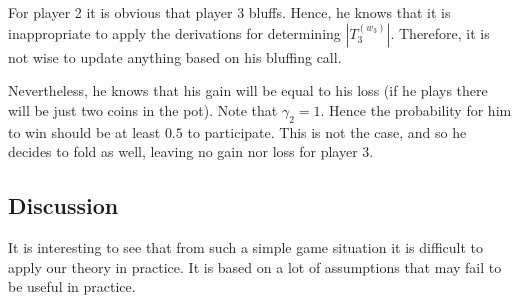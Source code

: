 \documentclass[a4paper,10pt]{article}
\begin{document}
For player 2 it is obvious that player 3 bluffs. Hence, he knows that it is inappropriate to apply the derivations for determining $|T_3^{(w_3)}|$. Therefore, it is not wise to update anything based on his bluffing call. 

Nevertheless, he knows that his gain will be equal to his loss (if he plays there will be just two coins in the pot). Note that $\gamma_2 = 1$. Hence the probability for him to win should be at least $0.5$ to participate. This is not the case, and so he decides to fold as well, leaving no gain nor loss for player 3. 

\subsection{Discussion}
It is interesting to see that from such a simple game situation it is difficult to apply our theory in practice. It is based on a lot of assumptions that may fail to be useful in practice. 


\begin{comment}
\begin{figure}[!h]
 \centering
\begin{tikzpicture}
  \node [mystate] (a) at (0,0) {$\bullet$};
  \node [mystate] (b) at (5,0) {$\bullet$};
  \draw (a) node[below] {$\neg p, q, \neg r$};
  \draw (b) node[below] {$p, q, r$};
  \draw (a) node[above] {$w_1$};
  \draw (b) node[above] {$w_2$};
  \draw (a) to node[below] {$b$} (b);
\end{tikzpicture}
\caption{Simple world}
\label{fig:wrld}
\end{figure}
\end{comment}
\end{document}
